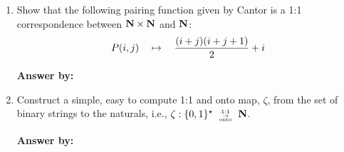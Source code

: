 \documentclass[12pt]{article}
\begin{document}
\noindent{}
\addtocounter{section}{1}

\begin{enumerate}
\item Show that the following pairing function given by Cantor is a 1:1
correspondence between $\mbox{\bf N}\times\mbox{\bf N}$ and $\mbox{\bf N}$:
\[ P(i,j) \quad\mapsto\quad {(i+j)(i+j+1)\over 2} + i\]

{\bf Answer by:} 

\item Construct a simple, easy to compute 1:1 and onto map, $\zeta$, from the set of binary strings
  to the naturals, i.e., $\zeta: \set{0,1}^\star\bijection\N$.

{\bf Answer by:} 

\end{enumerate}
\end{document}
